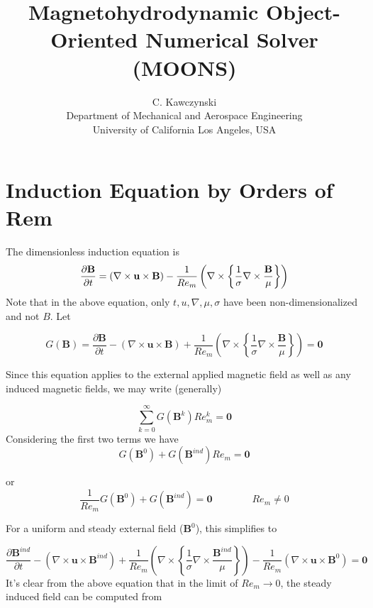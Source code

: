 \documentclass[11pt]{article}
\newcommand{\B}{\mathbf{B}}
\newcommand{\PD}{\partial}
\newcommand{\U}{\mathbf{u}}
\begin{document}
\doublespacing
\title{Magnetohydrodynamic Object-Oriented Numerical Solver (MOONS)}
\author{C. Kawczynski \\
Department of Mechanical and Aerospace Engineering \\
University of California Los Angeles, USA\\
}
\maketitle

\section{Induction Equation by Orders of Rem}
The dimensionless induction equation is
\begin{equation}
  \label{eq:ind}
  \frac{\PD \B}{\PD t} 
  =
  (\nabla \times \U \times \B)
  - \\
  \frac{1}{Re_m}
  \left(
  \nabla \times
  \left\{
  \frac{1}{\sigma}
  \nabla \times
  \frac{\B}{\mu}
  \right\}
  \right)
\end{equation}
Note that in the above equation, only $t,u,\nabla , \mu, \sigma$ have been non-dimensionalized and not $B$. Let

\begin{equation}
  G(\B)
  =
  \frac{\PD \B}{\PD t} 
  -
  (\nabla \times \U \times \B)
  +
  \frac{1}{Re_m}
  \left(
  \nabla \times
  \left\{
  \frac{1}{\sigma}
  \nabla \times
  \frac{\B}{\mu}
  \right\}
  \right)
  =
  \pmb{0}
\end{equation}

Since this equation applies to the external applied magnetic field as well as any induced magnetic fields, we may write (generally)

\begin{equation}
	\sum_{k=0}^{\infty} G(\B^k)
  Re_m^k
	=
	\pmb{0}
\end{equation}
Considering the first two terms we have
\begin{equation}
  G(\B^0)
  +
  G(\B^{ind}) Re_m
  =
  \pmb{0}
\end{equation}

or
\begin{equation}
  \frac{1}{Re_m}
  G(\B^0)
  +
  G(\B^{ind})
  =
  \pmb{0}
  \qquad \qquad
  Re_m \ne 0
\end{equation}

For a uniform and steady external field ($\B^0$), this simplifies to


\begin{equation}
  \frac{\PD \B^{ind}}{\PD t} 
  -
  (\nabla \times \U \times \B^{ind})
  +
  \frac{1}{Re_m}
  \left(
  \nabla \times
  \left\{
  \frac{1}{\sigma}
  \nabla \times
  \frac{\B^{ind}}{\mu}
  \right\}
  \right)
  -
  \frac{1}{Re_m}
  (\nabla \times \U \times \B^0)
  =
  \pmb{0}
\end{equation}
It's clear from the above equation that in the limit of $Re_m \rightarrow 0$, the steady induced field can be computed from
\end{document}
